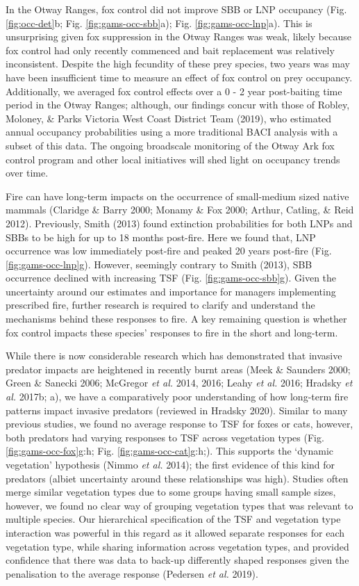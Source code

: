 \documentclass[]{elsarticle} %
\begin{document}
In the Otway Ranges, fox control did not improve SBB or LNP occupancy (Fig. \ref{fig:occ-det}b; Fig. \ref{fig:gams-occ-sbb}a); Fig. \ref{fig:gams-occ-lnp}a). This is unsurprising given fox suppression in the Otway Ranges was weak, likely because fox control had only recently commenced and bait replacement was relatively inconsistent. Despite the high fecundity of these prey species, two years was may have been insufficient time to measure an effect of fox control on prey occupancy. Additionally, we averaged fox control effects over a 0 - 2 year post-baiting time period in the Otway Ranges; although, our findings concur with those of Robley, Moloney, \& Parks Victoria West Coast District Team (2019), who estimated annual occupancy probabilities using a more traditional BACI analysis with a subset of this data. The ongoing broadscale monitoring of the Otway Ark fox control program and other local initiatives will shed light on occupancy trends over time.

Fire can have long-term impacts on the occurrence of small-medium sized native mammals (Claridge \& Barry 2000; Monamy \& Fox 2000; Arthur, Catling, \& Reid 2012). Previously, Smith (2013) found extinction probabilities for both LNPs and SBBs to be high for up to 18 months post-fire. Here we found that, LNP occurrence was low immediately post-fire and peaked 20 years post-fire (Fig. \ref{fig:gams-occ-lnp}g). However, seemingly contrary to Smith (2013), SBB occurrence declined with increasing TSF (Fig. \ref{fig:gams-occ-sbb}g). Given the uncertainty around our estimates and importance for managers implementing prescribed fire, further research is required to clarify and understand the mechanisms behind these responses to fire. A key remaining question is whether fox control impacts these species' responses to fire in the short and long-term.

While there is now considerable research which has demonstrated that invasive predator impacts are heightened in recently burnt areas (Meek \& Saunders 2000; Green \& Sanecki 2006; McGregor \emph{et al.} 2014, 2016; Leahy \emph{et al.} 2016; Hradsky \emph{et al.} 2017b; a), we have a comparatively poor understanding of how long-term fire patterns impact invasive predators (reviewed in Hradsky 2020). Similar to many previous studies, we found no average response to TSF for foxes or cats, however, both predators had varying responses to TSF across vegetation types (Fig. \ref{fig:gams-occ-fox}g:h; Fig. \ref{fig:gams-occ-cat}g:h;). This supports the `dynamic vegetation' hypothesis (Nimmo \emph{et al.} 2014); the first evidence of this kind for predators (albiet uncertainty around these relationships was high). Studies often merge similar vegetation types due to some groups having small sample sizes, however, we found no clear way of grouping vegetation types that was relevant to multiple species. Our hierarchical specification of the TSF and vegetation type interaction was powerful in this regard as it allowed separate responses for each vegetation type, while sharing information across vegetation types, and provided confidence that there was data to back-up differently shaped responses given the penalisation to the average response (Pedersen \emph{et al.} 2019).
\end{document}
